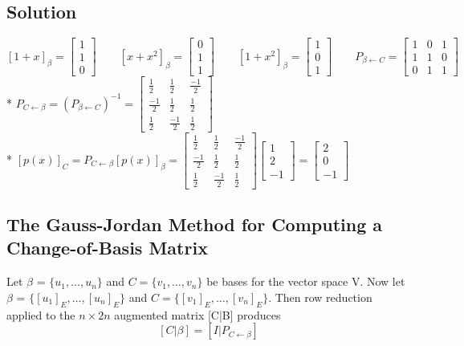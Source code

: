 \subsection*{Solution}
$[1+x]_\beta = \begin{bmatrix}
    1\\1\\0
\end{bmatrix}\qquad [x+x^2]_\beta = \begin{bmatrix}
    0\\1\\1
\end{bmatrix}\qquad [1+x^2]_\beta = \begin{bmatrix}
    1\\0\\1
\end{bmatrix}\qquad P_{\beta \leftarrow C} = \begin{bmatrix}
    1&0&1\\1&1&0\\0&1&1
\end{bmatrix}$\\*
$P_{C\leftarrow \beta} = (P_{\beta \leftarrow C})^{-1} = \begin{bmatrix}
    \frac{1}{2}&\frac{1}{2}&\frac{-1}{2}\\\frac{-1}{2}&\frac{1}{2}&\frac{1}{2}\\\frac{1}{2}&\frac{-1}{2}&\frac{1}{2}
\end{bmatrix}$\\*
$[p(x)]_C = P_{C\leftarrow \beta}[p(x)]_\beta = \begin{bmatrix}
    \frac{1}{2}&\frac{1}{2}&\frac{-1}{2}\\\frac{-1}{2}&\frac{1}{2}&\frac{1}{2}\\\frac{1}{2}&\frac{-1}{2}&\frac{1}{2}
\end{bmatrix}\begin{bmatrix}
    1\\2\\-1
\end{bmatrix} = \begin{bmatrix}
    2\\0\\-1
\end{bmatrix}$\\
\subsection{The Gauss-Jordan Method for Computing a Change-of-Basis Matrix}
Let $\beta$ = $\{u_1, \dots, u_n\}$ and $C = \{v_1, \dots, v_n\}$ be bases for the vector space V. Now let $\beta$ = $\{[u_1]_E, \dots, [u_n]_E\}$ and $C = \{[v_1]_E, \dots, [v_n]_E\}$. Then row reduction applied to the $n\times 2n$ augmented matrix [C|B] produces
$$[C|\beta] = [I|P_{C\leftarrow \beta}]$$
